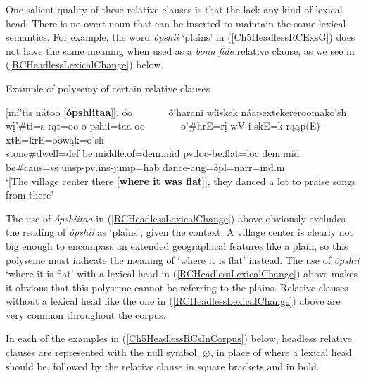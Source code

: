 One salient quality of these relative clauses is that the lack any kind of lexical head. There is no overt noun that can be inserted to maintain the same lexical semantics. For example, the word \textit{ópshii} `plains' in (\ref{Ch5HeadlessRCExsG}) does not have the same meaning when used as a \textit{bona fide} relative clause, as we see in (\ref{RCHeadlessLexicalChange}) below.

\begin{exe}
    \item\label{RCHeadlessLexicalChange} Example of polysemy of certain relative clauses

    \glll \textnormal{[}mí'tis nátoo \textnormal{[}\textbf{ópshiitaa}\textnormal{]]}, óo ~ ~ ~ ~ ó'harani wíiskek náapextekereroomako'sh\\
    wį'\#ti=s rąt=oo o-pshii=taa oo ~ ~ ~ ~ o'\#hrE=rį wV-i-skE=k rąąp(E)-xtE=krE=oowąk=o'sh\\
    \textnormal{stone}\#\textnormal{dwell}=def \textnormal{be.middle.of}=dem.mid pv.loc-\textnormal{be.flat}=loc dem.mid ~ ~ ~ ~ \textnormal{be}\#caus=ss unsp-pv.ins-\textnormal{jump}=hab \textnormal{dance}-aug=3pl=narr=ind.m\\
    \glt `[The village center there [\textbf{where it was flat}]], they danced a lot to praise songs from there' \citep[251]{hollow1973b}
\end{exe}

The use of \textit{ópshiitaa} in (\ref{RCHeadlessLexicalChange}) above obviously excludes the reading of \textit{ópshii} as `plains', given the context. A village center is clearly not big enough to encompass an extended geographical features like a plain, so this polyseme must indicate the meaning of `where it is flat' instead. The use of \textit{ópshii} `where it is flat' with a lexical head in (\ref{RCHeadlessLexicalChange}) above makes it obvious that this polyseme cannot be referring to the plains. Relative clauses without a lexical head like the one in (\ref{RCHeadlessLexicalChange}) above are very common throughout the corpus.

In each of the examples in (\ref{Ch5HeadlessRCsInCorpus}) below, headless relative clauses are represented with the null symbol, $\varnothing$, in place of where a lexical head should be, followed by the relative clause in square brackets and in bold.

